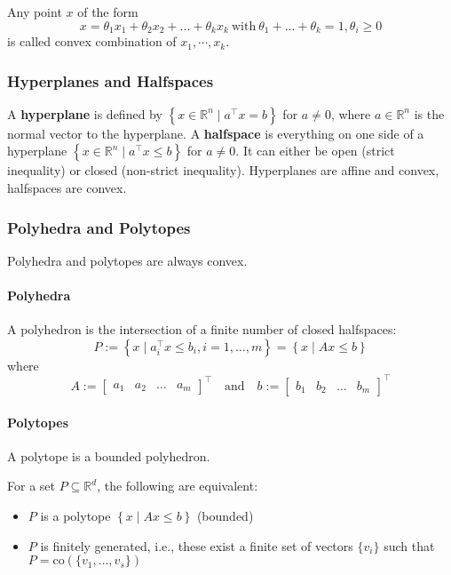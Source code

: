 Any point $x$ of the form
\begin{equation*}
    x=\theta_1x_1+\theta_2x_2+...+\theta_k x_k\mathrm{~with~}\theta_1+...+\theta_k=1,\theta_i\geq0
\end{equation*}
is called convex combination of $x_1,\cdots,x_k$.
\subsubsection{Hyperplanes and Halfspaces}
A \textbf{hyperplane} is defined by $\left\{x \in \mathbb{R}^n \mid a^\top x = b\right\}$ for $a \neq 0$, where $a \in \mathbb{R}^n$ is the normal vector to the hyperplane.
\newpar{}
A \textbf{halfspace} is everything on one side of a hyperplane $\left\{x \in \mathbb{R}^n \mid a^\top x \leq b\right\}$ for $a \neq 0$. It can either be open (strict inequality) or closed (non-strict inequality).
\newpar{}
Hyperplanes are affine and convex, halfspaces are convex.

\subsubsection{Polyhedra and Polytopes}
Polyhedra and polytopes are always convex.
\paragraph{Polyhedra}
A polyhedron is the intersection of a finite number of closed halfspaces:
\begin{equation*}
    P := \left\{ x \mid a_i^\top x \leq b_i, i = 1, \ldots, m \right\} = \left\{ x \mid Ax \leq b \right\}
\end{equation*}
where
\begin{equation*}
    A := \begin{bmatrix} a_1 & a_2 & \ldots & a_m \end{bmatrix}^\top \quad \text{and} \quad b := \begin{bmatrix} b_1 & b_2 & \ldots & b_m \end{bmatrix}^\top
\end{equation*}
\paragraph{Polytopes}
A polytope is a bounded polyhedron.
\newpar{}

For a set $P\subseteq \mathbb{R}^d$, the following are equivalent:
\begin{itemize}
    \item $P$ is a polytope $\left\{ x \mid Ax \leq b \right\}$ (bounded)
    \item $P$ is finitely generated, i.e., these exist a finite set of vectors $\{v_i\}$ such that $P=\mathrm{co}(\{v_1, \dots, v_s\})$
\end{itemize}

